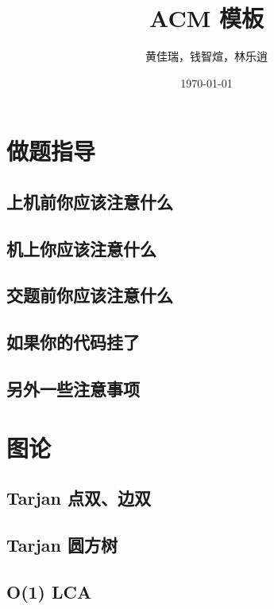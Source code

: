 \documentclass[10pt, a4paper, oneside]{ctexart}
\title{ACM 模板}
\author{黄佳瑞，钱智煊，林乐逍}
\date{\today}
\begin{document}
    \scriptsize
    \maketitle
    \newpage
    
    \begin{multicols}{2}
        \tableofcontents
        \newpage

        \section{做题指导}
        \subsection{上机前你应该注意什么}
        
        \subsection{机上你应该注意什么}
        
        \subsection{交题前你应该注意什么}
        
        \subsection{如果你的代码挂了}
        
        \subsection{另外一些注意事项}
        

        \section{图论}
        \subsection{Tarjan 点双、边双}
        
        \subsection{Tarjan 圆方树}
        
        \subsection{O(1) LCA}
        

\end{multicols}
\end{document}
